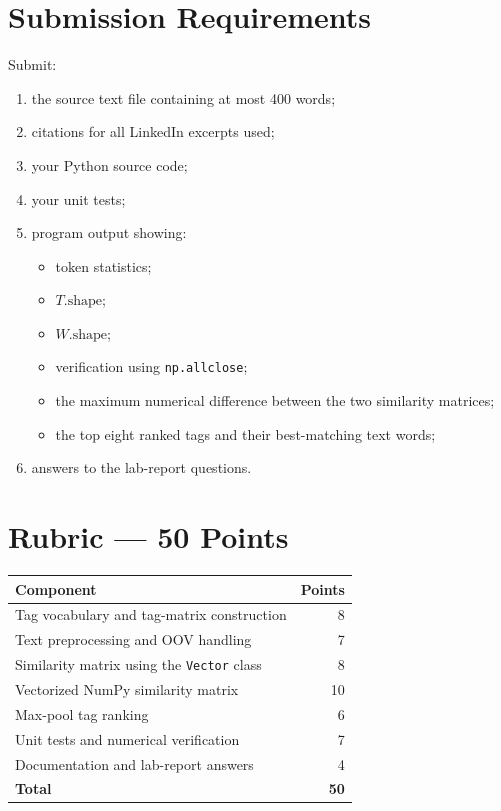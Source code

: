 \documentclass[12pt]{article}
\begin{document}
\section*{Submission Requirements}

Submit:

\begin{enumerate}
    \item the source text file containing at most 400 words;
    \item citations for all LinkedIn excerpts used;
    \item your Python source code;
    \item your unit tests;
    \item program output showing:
    \begin{itemize}
        \item token statistics;
        \item \(T.\mathrm{shape}\);
        \item \(W.\mathrm{shape}\);
        \item verification using \texttt{np.allclose};
        \item the maximum numerical difference between the two
              similarity matrices;
        \item the top eight ranked tags and their best-matching
              text words;
    \end{itemize}
    \item answers to the lab-report questions.
\end{enumerate}

\section*{Rubric --- 50 Points}

\begin{center}
\begin{tabular}{lr}
\toprule
\textbf{Component} & \textbf{Points}\\
\midrule
Tag vocabulary and tag-matrix construction        & 8\\
Text preprocessing and OOV handling               & 7\\
Similarity matrix using the \texttt{Vector} class & 8\\
Vectorized NumPy similarity matrix                 & 10\\
Max-pool tag ranking                               & 6\\
Unit tests and numerical verification              & 7\\
Documentation and lab-report answers               & 4\\
\midrule
\textbf{Total}                                     & \textbf{50}\\
\bottomrule
\end{tabular}
\end{center}
\end{document}
